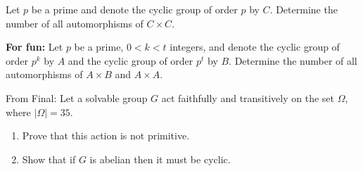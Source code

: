 \documentclass{article}
\begin{document}
\pagebreak

\begin{homeworkProblem}
    Let $p$ be a prime and denote the cyclic group of order $p$ by $C$. 
    Determine the number of all automorphisms of $C \times C$.

\end{homeworkProblem}

\pagebreak

\begin{homeworkProblem}
    \textbf{For fun:} Let $p$ be a prime, $0 < k < t$ integers,
    and denote the cyclic group of order $p^k$ by $A$
    and the cyclic group of order $p^t$ by $B$. Determine the 
    number of all automorphisms of $A \times B$ and $A \times A$.
    
\end{homeworkProblem}

\pagebreak

\begin{homeworkProblem}
    From Final: Let a solvable group $G$ act faithfully and
    transitively on the set $\Omega$, where $\lvert \Omega \rvert = 35$.
    \begin{enumerate}
        \item Prove that this action is not primitive.
        \item Show that if $G$ is abelian then it must be cyclic.
    \end{enumerate}
    
\end{homeworkProblem}
\end{document}
